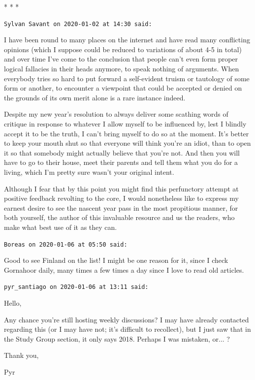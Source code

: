 
\begin{center}* * *\end{center}

\begin{footnotesize}
\begin{sffamily}
\texttt{Sylvan Savant on 2020-01-02 at 14:30 said:}

I have been round to many places on the internet and have read many conflicting opinions (which I suppose could be reduced to variations of about 4-5 in total) and over time I've come to the conclusion that people can't even form proper logical fallacies in their heads anymore, to speak nothing of arguments. When everybody tries so hard to put forward a self-evident truism or tautology of some form or another, to encounter a viewpoint that could be accepted or denied on the grounds of its own merit alone is a rare instance indeed.

Despite my new year's resolution to always deliver some scathing words of critique in response to whatever I allow myself to be influenced by, lest I blindly accept it to be the truth, I can't bring myself to do so at the moment. It's better to keep your mouth shut so that everyone will think you're an idiot, than to open it so that somebody might actually believe that you're not. And then you will have to go to their house, meet their parents and tell them what you do for a living, which I'm pretty sure wasn't your original intent.

Although I fear that by this point you might find this perfunctory attempt at positive feedback revolting to the core, I would nonetheless like to express my earnest desire to see the nascent year pass in the most propitious manner, for both yourself, the author of this invaluable resource and us the readers, who make what best use of it as they can.

\hfill

\texttt{Boreas on 2020-01-06 at 05:50 said:}

Good to see Finland on the list! I might be one reason for it, since I check Gornahoor daily, many times a few times a day since I love to read old articles.

\hfill

\texttt{pyr\_santiago on 2020-01-06 at 13:11 said:}

Hello,

Any chance you're still hosting weekly discussions? I may have already contacted regarding this (or I may have not; it's difficult to recollect), but I just saw that in the Study Group section, it only says 2018. Perhaps I was mistaken, or... ?

Thank you,

Pyr


\hfill

\end{sffamily}
\end{footnotesize}

